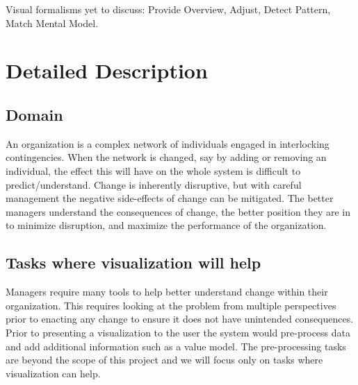 \documentclass{soups}
\begin{document}
Visual formalisms yet to discuss: Provide Overview, Adjust, Detect Pattern, Match Mental Model\cite{yi2007toward}.

\section{Detailed Description}

\subsection{Domain}

An organization is a complex network of individuals engaged in interlocking contingencies\cite{glenn2006complexity}. When the network is changed, say by adding or removing an individual, the effect this will have on the whole system is difficult to predict/understand. Change is inherently disruptive, but with careful management the negative side-effects of change can be mitigated. The better managers understand the consequences of change, the better position they are in to minimize disruption, and maximize the performance of the organization. 

\subsection{Tasks where visualization will help}

Managers require many tools to help better understand change within their organization.  This requires looking at the problem from multiple perspectives prior to enacting any change to ensure it does not have unintended consequences.  Prior to presenting a visualization to the user the system would pre-process data and add additional information such as a value model.  The pre-processing tasks are beyond the scope of this project and we will focus only on tasks where visualization can help.
\end{document}
